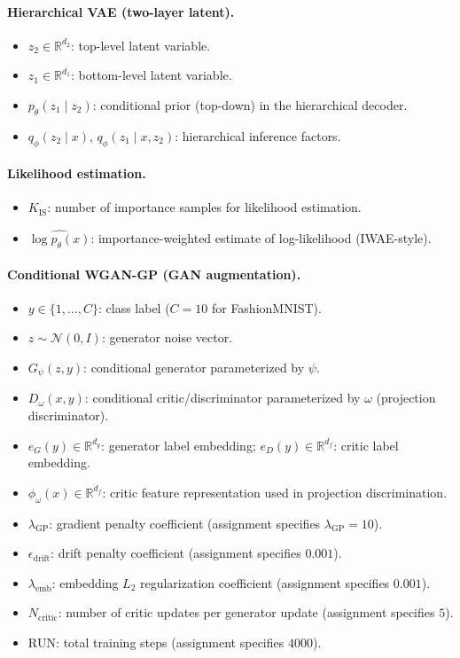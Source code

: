 \paragraph{Hierarchical VAE (two-layer latent).}
\begin{itemize}
  \item $z_2 \in \mathbb{R}^{d_2}$: top-level latent variable.
  \item $z_1 \in \mathbb{R}^{d_1}$: bottom-level latent variable.
  \item $p_\theta(z_1\mid z_2)$: conditional prior (top-down) in the hierarchical decoder.
  \item $q_\phi(z_2\mid x)$, $q_\phi(z_1\mid x,z_2)$: hierarchical inference factors.
\end{itemize}

\paragraph{Likelihood estimation.}
\begin{itemize}
  \item $K_{\mathrm{IS}}$: number of importance samples for likelihood estimation.
  \item $\widehat{\log p_\theta(x)}$: importance-weighted estimate of log-likelihood (IWAE-style).
\end{itemize}

\paragraph{Conditional WGAN-GP (GAN augmentation).}
\begin{itemize}
  \item $y \in \{1,\dots,C\}$: class label ($C=10$ for FashionMNIST).
  \item $z \sim \mathcal{N}(0,I)$: generator noise vector.
  \item $G_\psi(z,y)$: conditional generator parameterized by $\psi$.
  \item $D_\omega(x,y)$: conditional critic/discriminator parameterized by $\omega$ (projection discriminator).
  \item $e_G(y)\in\mathbb{R}^{d_y}$: generator label embedding; $e_D(y)\in\mathbb{R}^{d_f}$: critic label embedding.
  \item $\phi_\omega(x)\in\mathbb{R}^{d_f}$: critic feature representation used in projection discrimination.
  \item $\lambda_{\mathrm{GP}}$: gradient penalty coefficient (assignment specifies $\lambda_{\mathrm{GP}}=10$).
  \item $\epsilon_{\mathrm{drift}}$: drift penalty coefficient (assignment specifies $0.001$).
  \item $\lambda_{\mathrm{emb}}$: embedding $L_2$ regularization coefficient (assignment specifies $0.001$).
  \item $N_{\mathrm{critic}}$: number of critic updates per generator update (assignment specifies $5$).
  \item $\mathrm{RUN}$: total training steps (assignment specifies $4000$).
\end{itemize}

